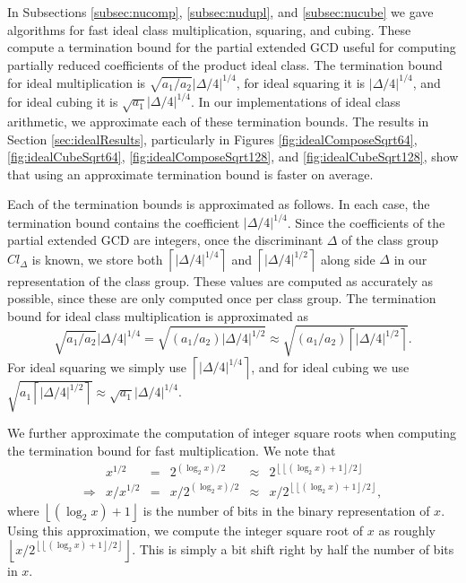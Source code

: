 \documentclass{ucalgthes1}
\theoremstyle{definition}
\newcommand{\floor}[1]{\left\lfloor #1 \right\rfloor}
\newcommand{\ceil}[1]{\left\lceil #1 \right\rceil}
\begin{document}
In Subsections \ref{subsec:nucomp}, \ref{subsec:nudupl}, and \ref{subsec:nucube} we gave algorithms for fast ideal class multiplication, squaring, and cubing.  These compute a termination bound for the partial extended GCD useful for computing partially reduced coefficients of the product ideal class.  The termination bound for ideal multiplication is $\sqrt{a_1/a_2}|\Delta/4|^{1/4}$, for ideal squaring it is $|\Delta/4|^{1/4}$, and for ideal cubing it is $\sqrt{a_1}|\Delta/4|^{1/4}$.  In our implementations of ideal class arithmetic, we approximate each of these termination bounds.  The results in Section \ref{sec:idealResults}, particularly in Figures \ref{fig:idealComposeSqrt64}, \ref{fig:idealCubeSqrt64}, \ref{fig:idealComposeSqrt128}, and \ref{fig:idealCubeSqrt128}, show that using an approximate termination bound is faster on average.

Each of the termination bounds is approximated as follows.  In each case, the termination bound contains the coefficient $|\Delta/4|^{1/4}$.  Since the coefficients of the partial extended GCD are integers, once the discriminant $\Delta$ of the class group $Cl_\Delta$ is known, we store both $\ceil{|\Delta/4|^{1/4}}$ and $\ceil{|\Delta/4|^{1/2}}$ along side $\Delta$ in our representation of the class group.  These values are computed as accurately as possible, since these are only computed once per class group.  The termination bound for ideal class multiplication is approximated as
\[
\sqrt{a_1/a_2}|\Delta/4|^{1/4} = \sqrt{(a_1/a_2) |\Delta/4|^{1/2}} \approx \sqrt{(a_1/a_2) \ceil{|\Delta/4|^{1/2}}}.
\]
For ideal squaring we simply use $\ceil{|\Delta/4|^{1/4}}$, and for ideal cubing we use $\sqrt{a_1\ceil{|\Delta/4|^{1/2}}} \approx \sqrt{a_1}|\Delta/4|^{1/4}$.  

We further approximate the computation of integer square roots when computing the termination bound for fast multiplication.  We note that 
\begin{equation*}
\begin{array}{rrlrlr}
	& x^{1/2} &=& 2^{(\log_2x)/2} &\approx& 2^{\floor{\floor{(\log_2x)+1}/2}} \\
	\Rightarrow & x / x^{1/2} &=& x / 2^{(\log_2x)/2} &\approx& x / 2^{\floor{\floor{(\log_2x)+1}/2}},
\end{array}
\end{equation*}
where $\floor{(\log_2x)+1}$ is the number of bits in the binary representation of $x$.  Using this approximation, we compute the integer square root of $x$ as roughly $\floor{x / 2^{\floor{\floor{(\log_2x)+1}/2}}}$.  This is simply a bit shift right by half the number of bits in $x$.
\end{document}
